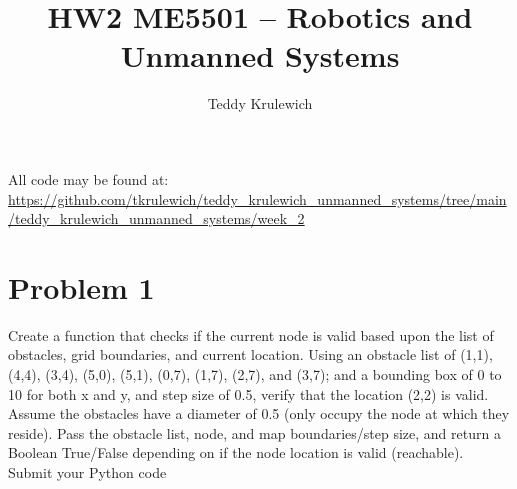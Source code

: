 \documentclass{article}
\author{Teddy Krulewich}
\title{\vspace{-4em}HW2 ME5501 – Robotics and Unmanned Systems}
\begin{document}
\maketitle

\noindent All code may be found at: \url{https://github.com/tkrulewich/teddy_krulewich_unmanned_systems/tree/main/teddy_krulewich_unmanned_systems/week_2}

\section*{Problem 1}

Create a function that checks if the current node is valid based upon the list of obstacles, grid 
boundaries, and current location. 
Using an obstacle list of (1,1), (4,4), (3,4), (5,0), (5,1), (0,7), (1,7), (2,7), and (3,7); and a bounding box 
of 0 to 10 for both x and y, and step size of 0.5, verify that the location (2,2) is valid. Assume the 
obstacles have a diameter of 0.5 (only occupy the node at which they reside).
Pass the obstacle list, node, and map boundaries/step size, and return a Boolean True/False 
depending on if the node location is valid (reachable).
Submit your Python code
\end{document}

